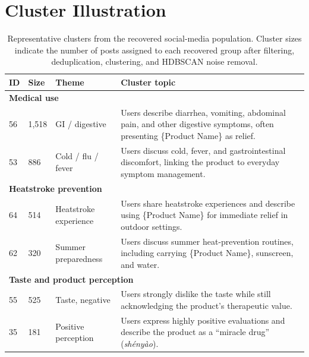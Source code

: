 \documentclass{article}
\begin{document}
\newpage

\section{Cluster Illustration}
\label{app:clusters}

\begin{table}[htb!]
\centering
\small
\begin{tabular}{p{}p{}p{}p{}}
\toprule
ID & Size & Theme & Cluster topic \\
\midrule

\multicolumn{4}{l}{\textbf{Medical use}} \\
\midrule
56 & 1{,}518 & GI / digestive &
Users describe diarrhea, vomiting, abdominal pain, and other digestive symptoms, often presenting \{Product Name\} as relief. \\[3pt]

53 & 886 & Cold / flu / fever &
Users discuss cold, fever, and gastrointestinal discomfort, linking the product to everyday symptom management. \\

\midrule
\multicolumn{4}{l}{\textbf{Heatstroke prevention}} \\
\midrule
64 & 514 & Heatstroke experience &
Users share heatstroke experiences and describe using \{Product Name\} for immediate relief in outdoor settings. \\[3pt]

62 & 320 & Summer preparedness &
Users discuss summer heat-prevention routines, including carrying \{Product Name\}, sunscreen, and water. \\

\midrule
\multicolumn{4}{l}{\textbf{Taste and product perception}} \\
\midrule
55 & 525 & Taste, negative &
Users strongly dislike the taste while still acknowledging the product's therapeutic value. \\[3pt]

35 & 181 & Positive perception &
Users express highly positive evaluations and describe the product as a ``miracle drug'' (\emph{sh\'{e}ny\`{a}o}). \\

\bottomrule
\end{tabular}
\caption{Representative clusters from the recovered social-media population. Cluster sizes indicate the number of posts assigned to each recovered group after filtering, deduplication, clustering, and HDBSCAN noise removal.}
\label{tab:clusters}
\end{table}
\end{document}
